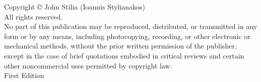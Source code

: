 \thispagestyle{empty}

\begin{center}
\vspace*{\fill}

{\small
Copyright © \the\year{} John Stilia (Ioannis Stylianakos)\\[0.5cm]
All rights reserved.\\[0.5cm]

No part of this publication may be reproduced, distributed, or transmitted in any form or by any means, 
including photocopying, recording, or other electronic or mechanical methods, without the prior written 
permission of the publisher, except in the case of brief quotations embodied in critical reviews and 
certain other noncommercial uses permitted by copyright law.\\[0.5cm]

First Edition\\[0.5cm]

}

\vspace*{\fill}
\end{center}

\clearpage  %